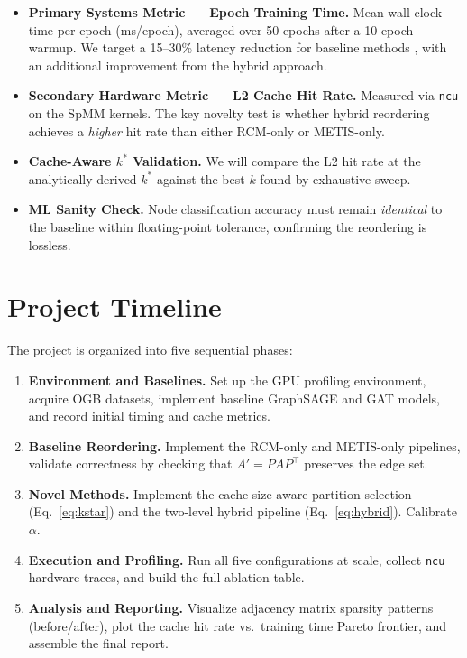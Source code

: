 \documentclass[sigconf,review]{acmart}
\begin{document}
\begin{itemize}
    \item \textbf{Primary Systems Metric --- Epoch Training Time.} Mean wall-clock time per epoch (ms/epoch), averaged over 50 epochs after a 10-epoch warmup. We target a 15--30\% latency reduction for baseline methods \cite{bayer2024reordering}, with an additional improvement from the hybrid approach.
    \item \textbf{Secondary Hardware Metric --- L2 Cache Hit Rate.} Measured via \texttt{ncu} on the SpMM kernels. The key novelty test is whether hybrid reordering achieves a \emph{higher} hit rate than either RCM-only or METIS-only.
    \item \textbf{Cache-Aware $k^*$ Validation.} We will compare the L2 hit rate at the analytically derived $k^*$ against the best $k$ found by exhaustive sweep.
    \item \textbf{ML Sanity Check.} Node classification accuracy must remain \emph{identical} to the baseline within floating-point tolerance, confirming the reordering is lossless.
\end{itemize}

\section{Project Timeline}

The project is organized into five sequential phases:

\begin{enumerate}
    \item \textbf{Environment and Baselines.} Set up the GPU profiling environment, acquire OGB datasets, implement baseline GraphSAGE and GAT models, and record initial timing and cache metrics.
    \item \textbf{Baseline Reordering.} Implement the RCM-only and METIS-only pipelines, validate correctness by checking that $A' = PAP^\top$ preserves the edge set.
    \item \textbf{Novel Methods.} Implement the cache-size-aware partition selection (Eq.~\eqref{eq:kstar}) and the two-level hybrid pipeline (Eq.~\eqref{eq:hybrid}). Calibrate $\alpha$.
    \item \textbf{Execution and Profiling.} Run all five configurations at scale, collect \texttt{ncu} hardware traces, and build the full ablation table.
    \item \textbf{Analysis and Reporting.} Visualize adjacency matrix sparsity patterns (before/after), plot the cache hit rate vs.\ training time Pareto frontier, and assemble the final report.
\end{enumerate}



\end{document}

